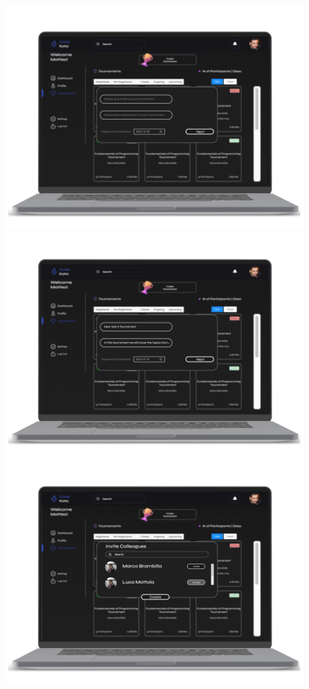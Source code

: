 \begin{center}
\includegraphics[scale=0.13]{Images/ui-ux/educator_create_tournament_1.png}
\includegraphics[scale=0.13]{Images/ui-ux/educator_create_tournament_2.png}
\includegraphics[scale=0.13]{Images/ui-ux/educator_create_tournament_3.png}

\end{center}
